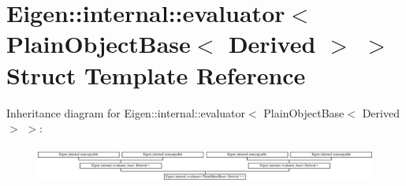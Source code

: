 \hypertarget{struct_eigen_1_1internal_1_1evaluator_3_01_plain_object_base_3_01_derived_01_4_01_4}{}\section{Eigen\+:\+:internal\+:\+:evaluator$<$ Plain\+Object\+Base$<$ Derived $>$ $>$ Struct Template Reference}
\label{struct_eigen_1_1internal_1_1evaluator_3_01_plain_object_base_3_01_derived_01_4_01_4}
Inheritance diagram for Eigen\+:\+:internal\+:\+:evaluator$<$ Plain\+Object\+Base$<$ Derived $>$ $>$\+:\begin{figure}[H]
\begin{center}
\leavevmode
\includegraphics[height=1.217391cm]{struct_eigen_1_1internal_1_1evaluator_3_01_plain_object_base_3_01_derived_01_4_01_4}
\end{center}
\end{figure}
